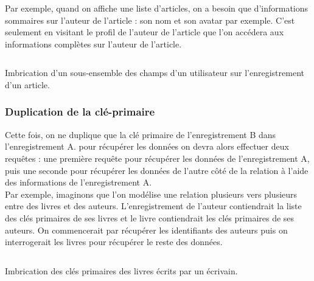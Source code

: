 		Par exemple, quand on affiche une liste d'articles, on a besoin que d'informations sommaires sur l'auteur de l'article : son nom et son avatar par exemple. C'est seulement en visitant le profil de l'auteur de l'article que l'on accédera aux informations complètes sur l'auteur de l'article.

		\begin{listing}[H]
			\inputminted{json}{code/duplicationSousEnsemble.json}
			\caption{Imbrication d'un sous-ensemble des champs d'un utilisateur sur l'enregistrement d'un article.}
		\end{listing}

	\subsubsection{Duplication de la clé-primaire}
		Cette fois, on ne duplique que la clé primaire de l'enregistrement B dans l'enregistrement A. pour récupérer les données on devra alors effectuer deux requêtes : une première requête pour récupérer les données de l'enregistrement A, puis une seconde pour récupérer les données de l'autre côté de la relation à l'aide des informations de l'enregistrement A.\\

		Par exemple, imaginons que l'on modélise une relation plusieurs vers plusieurs entre des livres et des auteurs. L'enregistrement de l'auteur contiendrait la liste des clés primaires de ses livres et le livre contiendrait les clés primaires de ses auteurs. On commencerait par récupérer les identifiants des auteurs puis on interrogerait les livres pour récupérer le reste des données.

		\begin{listing}[H]
			\inputminted{json}{code/duplicationClesPrimairesLivres.json}
			\caption{Imbrication des clés primaires des livres écrits par un écrivain.}
		\end{listing}
